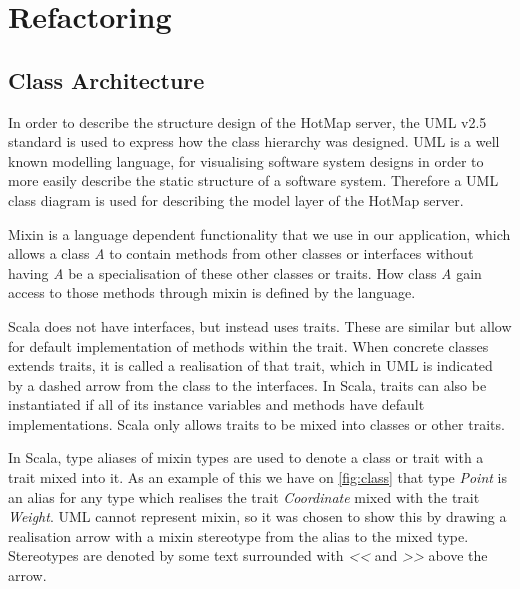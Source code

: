 \section{Refactoring} \label{sec:s4_refactoring}



\subsection{Class Architecture}
In order to describe the structure design of the HotMap server, the UML v2.5 standard is used to express how the class hierarchy was designed. UML is a well known modelling language, for visualising software system designs in order to more easily describe the static structure of a software system.
Therefore a UML class diagram is used for describing the model layer of the HotMap server.

Mixin is a language dependent functionality that we use in our application, which allows a class \emph{A} to contain methods from other classes or interfaces without having \emph{A} be a specialisation of these other classes or traits. How class \emph{A} gain access to those methods through mixin is defined by the language. 

Scala does not have interfaces, but instead uses traits. These are similar but allow for default implementation of methods within the trait. When concrete classes extends traits, it is called a realisation of that trait, which in UML is indicated by a dashed arrow from the class to the interfaces. In Scala, traits can also be instantiated if all of its instance variables and methods have default implementations. Scala only allows traits to be mixed into classes or other traits.

In Scala, type aliases of mixin types are used to denote a class or trait with a trait mixed into it. As an example of this we have on \cref{fig:class} that type \emph{Point} is an alias for any type which realises the trait \emph{Coordinate} mixed with the trait \emph{Weight}. UML cannot represent mixin, so it was chosen to show this by drawing a realisation arrow with a mixin stereotype from the alias to the mixed type. Stereotypes are denoted by some text surrounded with \emph{<<} and \emph{>>} above the arrow.

